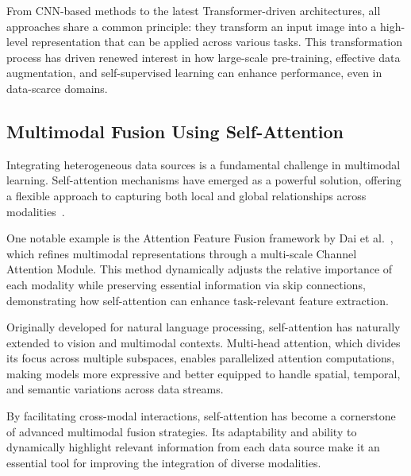 From CNN-based methods to the latest Transformer-driven architectures, all approaches share a common principle: they transform an input image into a high-level representation that can be applied across various tasks. This transformation process has driven renewed interest in how large-scale pre-training, effective data augmentation, and self-supervised learning can enhance performance, even in data-scarce domains.  

\subsection{Multimodal Fusion Using Self-Attention}

Integrating heterogeneous data sources is a fundamental challenge in multimodal learning. Self-attention mechanisms have emerged as a powerful solution, offering a flexible approach to capturing both local and global relationships across modalities~\cite{baltruvsaitis2018multimodal}.  

One notable example is the Attention Feature Fusion framework by Dai et al.~\cite{dai2021attentional}, which refines multimodal representations through a multi-scale Channel Attention Module. This method dynamically adjusts the relative importance of each modality while preserving essential information via skip connections, demonstrating how self-attention can enhance task-relevant feature extraction.  

Originally developed for natural language processing, self-attention has naturally extended to vision and multimodal contexts. Multi-head attention, which divides its focus across multiple subspaces, enables parallelized attention computations, making models more expressive and better equipped to handle spatial, temporal, and semantic variations across data streams.  

By facilitating cross-modal interactions, self-attention has become a cornerstone of advanced multimodal fusion strategies. Its adaptability and ability to dynamically highlight relevant information from each data source make it an essential tool for improving the integration of diverse modalities.